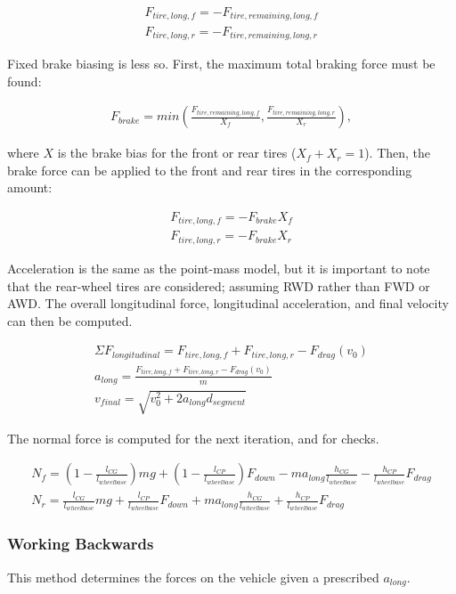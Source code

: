 \documentclass{article}
\begin{document}
\begin{align}
	F_{tire,long,f} = -F_{tire,remaining,long,f} \\
	F_{tire,long,r} = -F_{tire,remaining,long,r}
\end{align}

Fixed brake biasing is less so. First, the maximum total braking force must be found:

\begin{align}
	F_{brake} = min(\frac{F_{tire,remaining,long,f}}{X_{f}}, \frac{F_{tire,remaining,long,r}}{X_{r}}),
\end{align}

where $X$ is the brake bias for the front or rear tires ($X_f + X_r = 1$). Then, the brake force can be applied to the front and rear tires in the corresponding amount:

\begin{align}
	F_{tire,long,f} = - F_{brake} X_{f} \\
	F_{tire,long,r} = - F_{brake} X_{r}
\end{align}

Acceleration is the same as the point-mass model, but it is important to note that the rear-wheel tires are considered; assuming RWD rather than FWD or AWD. The overall longitudinal force, longitudinal acceleration, and final velocity can then be computed.

\begin{align}
	\Sigma F_{longitudinal} = F_{tire,long,f} + F_{tire,long,r} - F_{drag}(v_0) \\
	a_{long} = \frac{ F_{tire,long,f} + F_{tire,long,r} - F_{drag}(v_0)}{m} \\
	v_{final} = \sqrt{v_0^2 + 2 a_{long} d_{segment}}
\end{align}

The normal force is computed for the next iteration, and for checks.

\begin{align}
	N_f = (1 - \frac{l_{CG}}{l_{wheelbase}}) m g 
			+ (1 - \frac{l_{CP}}{l_{wheelbase}}) F_{down}
			- m a_{long} \frac{h_{CG}}{l_{wheelbase}} 
			- \frac{h_{CP}}{l_{wheelbase}} F_{drag} \\
	N_r = \frac{l_{CG}}{l_{wheelbase}} m g 
			+ \frac{l_{CP}}{l_{wheelbase}} F_{down}
			+ m a_{long} \frac{h_{CG}}{l_{wheelbase}} 
			+ \frac{h_{CP}}{l_{wheelbase}} F_{drag}
\end{align}

\subsubsection{Working Backwards}
This method determines the forces on the vehicle given a prescribed $a_{long}$.
\end{document}
